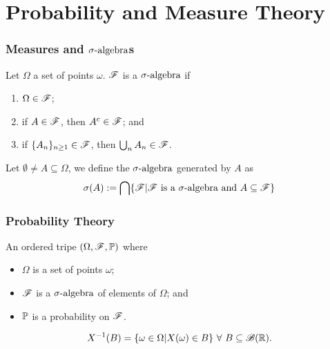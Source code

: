 \documentclass{beamer}
\begin{document}
\section{Probability and Measure Theory}
\begin{frame}
\frametitle{Measures and $\salg$s}
\begin{definition}[$\salg$]
	Let $\Omega$ a set of points $\omega$. $\mathscr{F}$ is a $\salg$ if
	\begin{enumerate}
		\item $\Omega \in \mathscr{F}$;
		\item if $A \in 	\mathscr{F}$, then $A^c \in \mathscr{F}$; and
		\item if $\{A_n\}_{n\geq 1} \in \mathscr{F}$, then $\bigcup_n A_n \in \mathscr{F}$.
	\end{enumerate}
\end{definition}

\begin{definition}
	Let $\emptyset \neq A\subseteq\Omega$, we define the $\salg$ generated by $A$ as
	\[
		\sigma(A) := \bigcap\{\mathscr{F} | \mathscr{F} \text{ is a $\sigma\text{-algebra}$ and } A \subseteq \mathscr{F}\}
	\]
\end{definition}
\end{frame}


\begin{frame}
\frametitle{Probability Theory}
\begin{definition}
An ordered tripe $(\Omega, \mathscr{F}, \mathbb{P})$ where
\begin{itemize}
	\item $\Omega$ is a set of points $\omega$;
	\item $\mathscr{F}$ is a $\salg$ of elements of $\Omega$; and
	\item $\mathbb{P}$ is a probability on $\mathscr{F}$. 
\end{itemize}
\end{definition}

\begin{definition}
	\[
		X^{-1}(B) = \{\omega \in \Omega | X(\omega) \in B\} \ \forall \ B \subseteq \mathscr{B}(\mathbb{R}).
	\]
\end{definition}
\end{frame}
\end{document}
